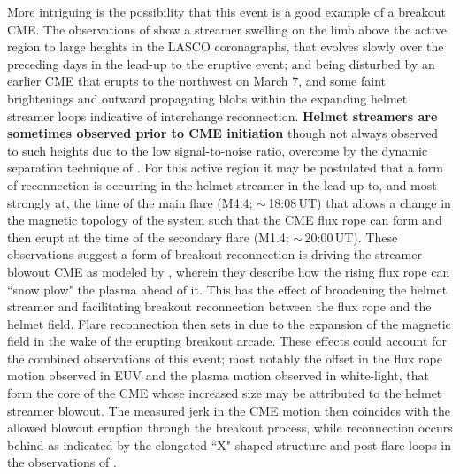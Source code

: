 \documentclass[namedreferences]{solarphysics}
\begin{document}
\begin{article}

More intriguing is the possibility that this event is a good example of a breakout CME. The observations of  show a streamer swelling on the limb above the active region to large heights in the LASCO coronagraphs, that evolves slowly over the preceding days in the lead-up to the eruptive event; and being disturbed by an earlier CME that erupts to the northwest on March 7, and some faint brightenings and outward propagating blobs within the expanding helmet streamer loops indicative of interchange reconnection. {\bf Helmet streamers are sometimes observed prior to CME initiation} \cite{1993JGR....9813177H} though not always observed to such heights due to the low signal-to-noise ratio, overcome by the dynamic separation technique of . For this active region it may be postulated that a form of reconnection is occurring in the helmet streamer in the lead-up to, and most strongly at, the time of the main flare (M4.4; $\sim$\,18:08\,UT) that allows a change in the magnetic topology of the system such that the CME flux rope can form and then erupt at the time of the secondary flare (M1.4; $\sim$\,20:00\,UT). These observations suggest a form of breakout reconnection is driving the streamer blowout CME as modeled by , wherein they describe how the rising flux rope can ``snow plow" the plasma ahead of it. This has the effect of broadening the helmet streamer and facilitating breakout reconnection between the flux rope and the helmet field. Flare reconnection then sets in due to the expansion of the magnetic field in the wake of the erupting breakout arcade. These effects could account for the combined observations of this event; most notably the offset in the flux rope motion observed in EUV and the plasma motion observed in white-light, that form the core of the CME whose increased size may be attributed to the helmet streamer blowout. The measured jerk in the CME motion then coincides with the allowed blowout eruption through the breakout process, while reconnection occurs behind as indicated by the elongated ``X"-shaped structure and post-flare loops in the observations of .


\end{article}
\end{document}
